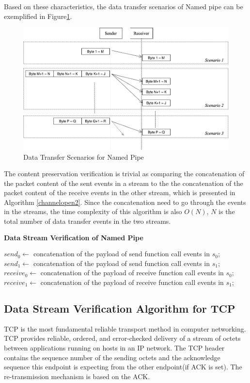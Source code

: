 Based on these characteristics, the data transfer scenarios of Named pipe can be exemplified in Figure\ref{namedpipe}. 
\begin{figure}[H]
\centerline{\includegraphics[scale=0.4]{Figures/namedpipe}}
\caption{Data Transfer Scenarios for Named Pipe}
\label{namedpipe}
\end{figure}

The content preservation verification is trivial as comparing the concatenation of the packet content of the sent events in a stream to the the concatenation of the packet content of the receive events in the other stream, which is presented in Algorithm \ref{channelopen2}. Since the concatenation need to go through the events in the streams, the time complexity of this algorithm is also $O(N)$, $N$ is the total number of data transfer events in the two streams.

\begin{algorithm}[H]
\DontPrintSemicolon
\caption{{\bf Data Stream Verification of Named Pipe} \label{dataAlg1}}
\;
$send_0 \leftarrow$ concatenation of the payload of send function call events in $s_0$;\;
$send_1 \leftarrow$ concatenation of the payload of send function call events in $s_1$;\;
$receive_0 \leftarrow$ concatenation of the payload of receive function call events in $s_0$;\;
$receive_1 \leftarrow$ concatenation of the payload of receive function call events in $s_1$;\;
\end{algorithm} 

\subsection{Data Stream Verification Algorithm for TCP}
TCP is the most fundamental reliable transport method in computer networking. TCP provides reliable, ordered, and error-checked delivery of a stream of octets between applications running on hosts in an IP network. The TCP header contains the sequence number of the sending octets and the acknowledge sequence this endpoint is expecting from the other endpoint(if ACK is set). The re-transmission mechanism is based on the ACK. 

